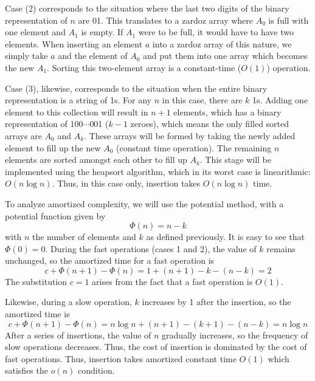 \documentclass[10pt]{article}
\begin{document}
Case (2) corresponds to the situation where the last two digits of the binary representation of $n$ are 01. This translates to a zardoz array where $A_0$ is full with one element and $A_1$ is empty. If $A_1$ were to be full, it would have to have two elements. When inserting an element $a$ into a zardoz array of this nature, we simply take $a$ and the element of $A_0$ and put them into one array which becomes the new $A_1$. Sorting this two-element array is a constant-time ($O(1)$) operation.

Case (3), likewise, corresponds to the situation when the entire binary representation is a string of 1s. For any $n$ in this case, there are $k$ 1s. Adding one element to this collection will result in $n+1$ elements, which has a binary representation of 100$\cdots$001 ($k-1$ zeroes), which means the only filled sorted arrays are $A_0$ and $A_k$. These arrays will be formed by taking the newly added element to fill up the new $A_0$ (constant time operation). The remaining $n$ elements are sorted amongst each other to fill up $A_k$. This stage will be implemented using the heapsort algorithm, which in its worst case is linearithmic: $O(n\log n)$. Thus, in this case only, insertion takes $O(n\log n)$ time.

To analyze amortized complexity, we will use the potential method, with a potential function given by $$\Phi(n) = n - k$$ with $n$ the number of elements and $k$ as defined previously. It is easy to see that $\Phi(0) = 0$. During the fast operations (cases 1 and 2), the value of $k$ remains unchanged, so the amortized time for a fast operation is $$c + \Phi(n + 1) - \Phi(n) = 1 + (n + 1) - k - (n - k) = 2$$ The substitution $c = 1$ arises from the fact that a fast operation is $O(1)$.

Likewise, during a slow operation, $k$ increases by 1 after the insertion, so the amortized time is $$c + \Phi(n + 1) - \Phi(n) = n\log n + (n + 1) - (k + 1) - (n - k) = n\log n$$
After a series of insertions, the value of $n$ gradually increases, so the frequency of slow operations decreases. Thus, the cost of insertion is dominated by the cost of fast operations. Thus, insertion takes amortized constant time $O(1)$ which satisfies the $o(n)$ condition.
\end{document}

